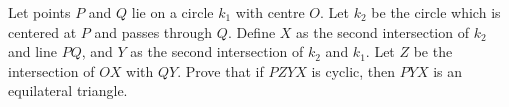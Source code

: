 Let points $P$ and $Q$ lie on a circle $k_1$ with centre $O$.
Let $k_2$ be the circle which is centered at $P$ and passes through $Q$.
Define $X$ as the second intersection of $k_2$ and line $PQ$,
and $Y$ as the second intersection of $k_2$ and $k_1$.
Let $Z$ be the intersection of $OX$ with $QY$.
Prove that if $PZYX$ is cyclic, then $PYX$ is an equilateral triangle.

